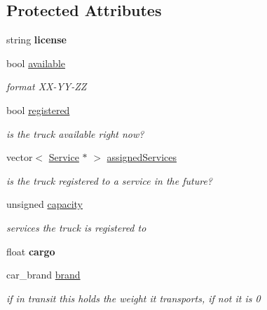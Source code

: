 \subsection*{Protected Attributes}
\begin{DoxyCompactItemize}
\item 
\mbox{\label{class_truck_a3dd293529f462f3a21838f9a6bc5a7d2}} 
string {\bfseries license}
\item 
\mbox{\label{class_truck_a4189fe5ed32f6084459a9c5ae1eb7c2a}} 
bool \hyperlink{class_truck_a4189fe5ed32f6084459a9c5ae1eb7c2a}{available}
\begin{DoxyCompactList}\small\item\em format X\+X-\/\+Y\+Y-\/\+ZZ \end{DoxyCompactList}\item 
\mbox{\label{class_truck_a80b8405cf7a15b236fef70116f99c4fb}} 
bool \hyperlink{class_truck_a80b8405cf7a15b236fef70116f99c4fb}{registered}
\begin{DoxyCompactList}\small\item\em is the truck available right now? \end{DoxyCompactList}\item 
\mbox{\label{class_truck_a3b153477458e5c93c1521ee2f4741638}} 
vector$<$ \hyperlink{class_service}{Service} $\ast$ $>$ \hyperlink{class_truck_a3b153477458e5c93c1521ee2f4741638}{assigned\+Services}
\begin{DoxyCompactList}\small\item\em is the truck registered to a service in the future? \end{DoxyCompactList}\item 
\mbox{\label{class_truck_ab004524786ae7aebf7c7bdb5e1599696}} 
unsigned \hyperlink{class_truck_ab004524786ae7aebf7c7bdb5e1599696}{capacity}
\begin{DoxyCompactList}\small\item\em services the truck is registered to \end{DoxyCompactList}\item 
\mbox{\label{class_truck_a1729700d52b22ff59b11b3238e6b0db8}} 
float {\bfseries cargo}
\item 
\mbox{\label{class_truck_a4e30b27a9898eba7ac8404d25cbdd265}} 
car\+\_\+brand \hyperlink{class_truck_a4e30b27a9898eba7ac8404d25cbdd265}{brand}
\begin{DoxyCompactList}\small\item\em if in transit this holds the weight it transports, if not it is 0 \end{DoxyCompactList}\end{DoxyCompactItemize}


